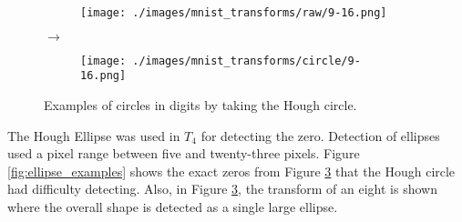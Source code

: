 \begin{figure}[H]
    \par\medskip

    \begin{subfigure}{.15\columnwidth}
        \centering
        \texttt{[image: ./images/mnist\_transforms/raw/9-16.png]}
        \caption{}
        \label{fig:circle_orig5}
    \end{subfigure}%
    $\rightarrow$
    \begin{subfigure}{.15\columnwidth}
        \centering
        \texttt{[image: ./images/mnist\_transforms/circle/9-16.png]}
        \caption{}
        \label{fig:circle_transform5}
    \end{subfigure}%

    \caption{Examples of circles in digits by taking the Hough circle.}
    \label{fig:circle_examples}
\end{figure}

The Hough Ellipse was used in $T_4$ for detecting the zero. Detection of
ellipses used a pixel range between five and twenty-three pixels. Figure
\ref{fig:ellipse_examples} shows the exact zeros from Figure
\ref{fig:circle_examples} that the Hough circle had difficulty detecting. Also,
in Figure \ref{fig:circle_examples}, the transform of an eight is shown where
the overall shape is detected as a single large ellipse.

